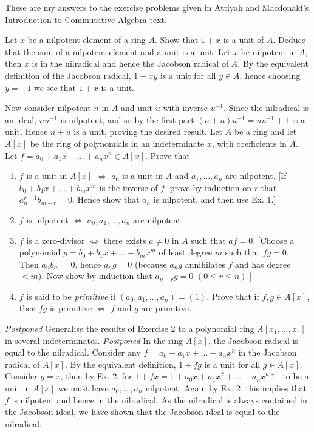 \documentclass[a4paper]{article}
\begin{document}
\maketitle
These are my answers to the exercise problems given in Attiyah and Macdonald's Introduction to Commutative Algebra text.
\begin{qanda}
  \question
    Let $x$ be a nilpotent element of a ring $A$. Show that $1+x$ is a unit of $A$. Deduce that the sum of a nilpotent element and a unit is a unit.
  \answer
    Let $x$ be nilpotent in $A$, then $x$ is in the nilradical and hence the Jacobson radical of $A$. By the equivalent definition of the Jacobson radical, $1-xy$ is a unit for all $y\in A$, hence choosing $y = -1$ we see that $1+x$ is a unit.
    
    Now consider nilpotent $n$ in $A$ and unit $u$ with inverse $u^{-1}$. Since the nilradical is an ideal, $nu^{-1}$ is nilpotent, and so by the first part $(n+u)u^{-1} = nu^{-1} + 1$ is a unit. Hence $n+u$ is a unit, proving the desired result.
  \question
    Let $A$ be a ring and let $A[x]$ be the ring of polynomials in an indeterminate $x$, with coefficients in $A$. Let $f = a_0 + a_1 x + \dots + a_n x^n\in A[x]$. Prove that
    \begin{enumerate}
        \item $f$ is a unit in $A[x]$ $\iff$ $a_0$ is a unit in $A$ and $a_1, \dots, a_n$ are nilpotent. [If $b_0 + b_1x + \dots + b_m x^m$ is the inverse of $f$, prove by induction on $r$ that $a_n^{r+1}b_{m-r} = 0$. Hence show that $a_n$ is nilpotent, and then use Ex. 1.]
        \item $f$ is nilpotent $\iff$ $a_0, a_1, \dots, a_n$ are nilpotent.
        \item $f$ is a zero-divisor $\iff$ there exists $a\neq 0$ in $A$ such that $af = 0$. [Choose a polynomial $g = b_0 + b_1 x + \dots + b_m x^m$ of least degree $m$ such that $fg = 0$. Then $a_n b_m = 0$, hence $a_n g = 0$ (because $a_ng$ annihilates $f$ and has degree $< m$). Now show by induction that $a_{n-r} g = 0$ $(0 \leq r \leq n)$.]
        \item $f$ is said to be \emph{primitive} if $(a_0,a_1, \dots, a_n) = (1)$. Prove that if $f,g \in A[x]$, then $fg$ is primitive $\iff$ $f$ and $g$ are primitive.
    \end{enumerate}
  \answer
    \emph{Postponed}
  \question
    Generalise the results of Exercise 2 to a polynomial ring $A[x_1,\dots,x_r]$ in several indeterminates.
  \answer
    \emph{Postponed}
  \question 
    In the ring $A[x]$, the Jacobson radical is equal to the nilradical.
  \answer
      Consider any $f = a_0 + a_1 x + \dots + a_n x^n$ in the Jacobson radical of $A[x]$. By the equivalent definition, $1 + fg$ is a unit for all $g \in A[x]$. Consider $g=x$, then by Ex. 2, for $1+fx = 1 + a_0 x + a_1 x^2 + \dots + a_n x^{n+1}$ to be a unit in $A[x]$ we must have $a_0,\dots,a_n$ nilpotent. Again by Ex. 2, this implies that $f$ is nilpotent and hence in the nilradical. As the nilradical is always contained in the Jacobson ideal, we have shown that the Jacobson ideal is equal to the nilradical.
\end{qanda}
\end{document}
